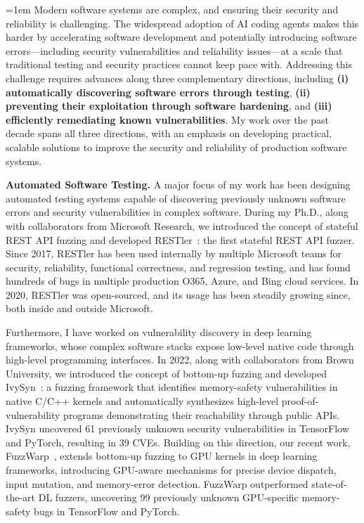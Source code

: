 \documentclass[letterpaper,single,8pt]{article}
\begin{document}
\title{\vspace{-1.2cm}{\bf Towards Secure and Reliable Software Systems}}
\author{ {\rm Vaggelis Atlidakis} }
\date{}
\maketitle

\begingroup\emergencystretch=1em
Modern software systems are complex, and ensuring their security and reliability is challenging. The widespread adoption of AI coding agents makes this harder by accelerating software development and potentially introducing software errors---including security vulnerabilities and reliability issues---at a scale that traditional testing and security practices cannot keep pace with. Addressing this challenge requires advances along three complementary directions, including \textbf{(i) automatically discovering software errors through testing}, \textbf{(ii) preventing their exploitation through software hardening}, and \textbf{(iii) efficiently remediating known vulnerabilities}. My work over the past decade spans all three directions, with an emphasis on developing practical, scalable solutions to improve the security and reliability of production software systems.
\par\endgroup

\textbf{Automated Software Testing.} A major focus of my work has been designing automated testing systems capable of discovering previously unknown software errors and security vulnerabilities in complex software. During my Ph.D., along with collaborators from Microsoft Research, we introduced the concept of stateful REST API fuzzing and developed RESTler~\cite{restler,restler2}: the first stateful REST API fuzzer. Since 2017, RESTler has been used internally by multiple Microsoft teams for security, reliability, functional correctness, and regression testing, and has found hundreds of bugs in multiple production O365, Azure, and Bing cloud services. In 2020, RESTler was open-sourced, and its usage has been steadily growing since, both inside and outside Microsoft.

Furthermore, I have worked on vulnerability discovery in deep learning frameworks, whose complex software stacks expose low-level native code through high-level programming interfaces. In 2022, along with collaborators from Brown University, we introduced the concept of bottom-up fuzzing and developed IvySyn~\cite{ivysyn}: a fuzzing framework that identifies memory-safety vulnerabilities in native C/C++ kernels and automatically synthesizes high-level proof-of-vulnerability programs demonstrating their reachability through public APIs. IvySyn uncovered 61 previously unknown security vulnerabilities in TensorFlow and PyTorch, resulting in 39 CVEs. Building on this direction, our recent work, FuzzWarp~\cite{fuzzwarp}, extends bottom-up fuzzing to GPU kernels in deep learning frameworks, introducing GPU-aware mechanisms for precise device dispatch, input mutation, and memory-error detection. FuzzWarp outperformed state-of-the-art DL fuzzers, uncovering 99 previously unknown GPU-specific memory-safety bugs in TensorFlow and PyTorch.
\end{document}
